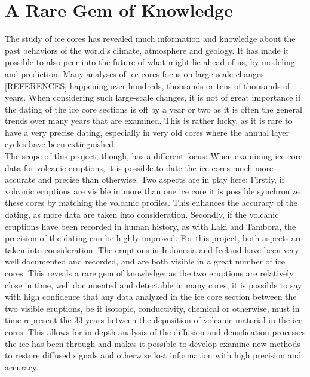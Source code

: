 \documentclass[../../CompleteThesis/Complete_1stDraft]{subfiles}
\begin{document}
\section[A Rare Gem]{A Rare Gem of Knowledge}
The study of ice cores has revealed much information and knowledge about the past behaviors of the world's climate, atmosphere and geology. It has made it possible to also peer into the future of what might lie ahead of us, by modeling and prediction. Many analyses of ice cores focus on large scale changes [REFERENCES] happening over hundreds, thousands or tens of thousands of years. When considering such large-scale changes, it is not of great importance if the dating of the ice core sections is off by a year or two as it is often the general trends over many years that are examined. This is rather lucky, as it is rare to have a very precise dating, especially in very old cores where the annual layer cycles have been extinguished. \\
The scope of this project, though, has a different focus: When examining ice core data for volcanic eruptions, it is possible to date the ice cores much more accurate and precise than otherwise. Two aspects are in play here: Firstly, if volcanic eruptions are visible in more than one ice core it is possible synchronize these cores by matching the volcanic profiles. This enhances the accuracy of the dating, as more data are taken into consideration. Secondly, if the volcanic eruptions have been recorded in human history, as with Laki and Tambora, the precision of the dating can be highly improved. For this project, both aspects are taken into consideration. The eruptions in Indonesia and Iceland have been very well documented and recorded, and are both visible in a great number of ice cores. This reveals a rare gem of knowledge: as the two eruptions are relatively close in time, well documented and detectable in many cores, it is possible to say with high confidence that any data analyzed in the ice core section between the two visible eruptions, be it isotopic, conductivity, chemical or otherwise, must in time represent the 33 years between the deposition of volcanic material in the ice cores. This allows for in depth analysis of the diffusion and densification processes the ice has been through and makes it possible to develop examine new methods to restore diffused signals and otherwise lost information with high precision and accuracy.
\end{document}

